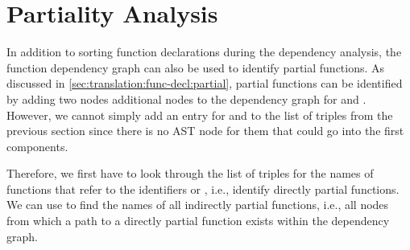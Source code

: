 \section{Partiality Analysis} \label{sec:implementation:partiality-analysis}
In addition to sorting function declarations during the dependency analysis, the function dependency graph can also be used to identify partial functions.
As discussed in \autoref{sec:translation:func-decl:partial}, partial functions can be identified by adding two nodes additional nodes to the dependency graph for  and .
However, we cannot simply add an entry for  and  to the list of triples from the previous section since there is no AST node for them that could go into the first components.

Therefore, we first have to look through the list of triples for the names of functions that refer to the identifiers  or , i.e., identify directly partial functions.
We can use  to find the names of all indirectly partial functions, i.e., all nodes from which a path to a directly partial function exists within the dependency graph.
